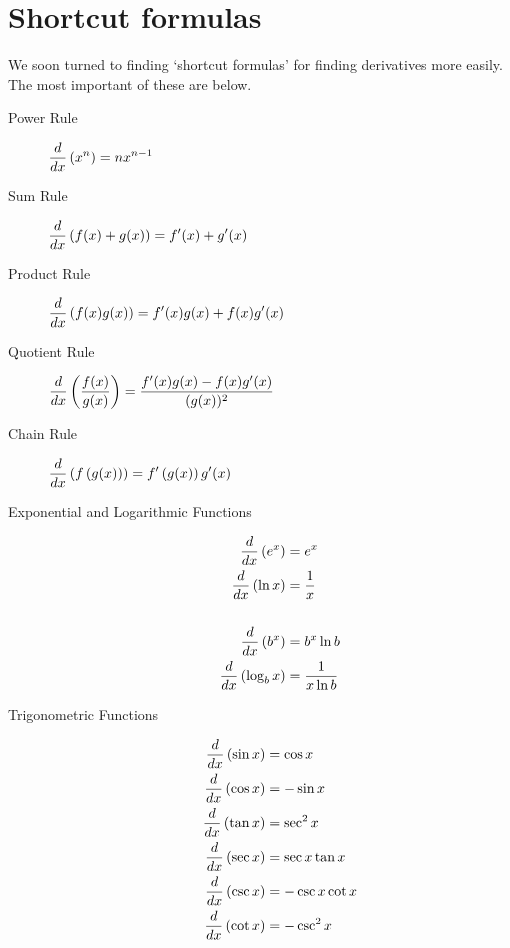 \documentclass{ximera}
\begin{document}
\section{Shortcut formulas}
We soon turned to finding `shortcut formulas' for finding derivatives more easily.   The most important of these are below.
\begin{description}
	\item[Power Rule] $\displaystyle \frac{d}{\mathop{}\!d x}\left( x^n \right) = n x^{n-1}$
	\item[Sum Rule] $\displaystyle \frac{d}{\mathop{}\!d x} \left( f(x) + g(x) \right) = f'(x) + g'(x)$
	\item[Product Rule] $\displaystyle \frac{d}{\mathop{}\!d x} \left( f(x) g(x) \right) = f'(x) g(x) + f(x) g'(x)$
	\item[Quotient Rule] $\displaystyle \frac{d}{\mathop{}\!d x}\left( \dfrac{f(x)}{g(x)} \right) = \dfrac{f'(x)g(x) - f(x) g'(x)}{(g(x))^2}$
	\item[Chain Rule] $\displaystyle \frac{d}{\mathop{}\!d x} \left( f\left(g(x) \right) \right) = f'\left( g(x) \right) g'(x)$
	\item[Exponential and Logarithmic Functions]{
		\begin{align*}
			\frac{d}{\mathop{}\!d x} \left( e^x \right) 		&= e^x\\
			\frac{d}{\mathop{}\!d x} \left( \ln x \right) 		&= \dfrac{1}{x}\\
			\\
			\frac{d}{\mathop{}\!d x} \left( b^x \right) 		&= b^x \ln b\\
			\frac{d}{\mathop{}\!d x} \left( \log_b x\right) 	&= \dfrac{1}{x \ln b}
		\end{align*}
	}	
	\item[Trigonometric Functions]{
		\begin{align*}
			\frac{d}{\mathop{}\!d x}\left( \sin x\right) 		&= \cos x\\
			\frac{d}{\mathop{}\!d x} \left( \cos x \right) 	&= - \sin x\\
			\frac{d}{\mathop{}\!d x}\left( \tan x \right) 	&= \sec^2 x\\
			\frac{d}{\mathop{}\!d x} \left( \sec x \right) 	&=  \sec x \tan x\\
			\frac{d}{\mathop{}\!d x} \left( \csc x \right) 	&= - \csc x \cot x\\
			\frac{d}{\mathop{}\!d x} \left( \cot x \right) 	&= - \csc^2 x
		\end{align*}	
	}		
\end{description}
\end{document}
